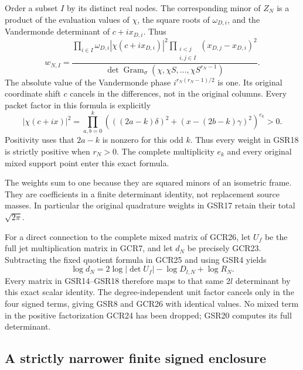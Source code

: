 Order a subset $I$ by its distinct real nodes. The corresponding
minor of $Z_N$ is a product of the evaluation values of $\chi$,
the square roots of $\omega_{D,i}$, and the Vandermonde
determinant of $c+ix_{D,i}$. Thus
\[
 w_{N,I}=
 \frac{\displaystyle
   \prod_{i\in I}\omega_{D,i}|\chi(c+ix_{D,i})|^2
   \prod_{\substack{i<j\\i,j\in I}}(x_{D,j}-x_{D,i})^2}
 {\displaystyle
   \det\operatorname{Gram}_\sigma
               (\chi,\chi S,\ldots,\chi S^{r_N-1})}.
\tag{GSR18}
\]
The absolute value of the Vandermonde phase
$i^{r_N(r_N-1)/2}$ is one. Its original coordinate shift $c$
cancels in the differences, not in the original columns.
Every packet factor in this formula is explicitly
\[
 |\chi(c+ix)|^2
  =\prod_{a,b=0}^k
     \left(((2a-k)\delta)^2+
                    (x-(2b-k)\gamma)^2\right)^{e_k}>0.
\tag{GSR19}
\]
Positivity uses that $2a-k$ is nonzero for this odd $k$.
Thus every weight in GSR18 is strictly positive when $r_N>0$.
The complete multiplicity $e_k$ and every original mixed support
point enter this exact formula.

The weights sum to one because they are squared minors of
an isometric frame. They are coefficients in a finite
determinant identity, not replacement source masses. In
particular the original quadrature weights in GSR17 retain
their total $\sqrt{2\pi}$.

For a direct connection to the complete mixed matrix of GCR26,
let $U_f$ be the full jet multiplication matrix in GCR7,
and let $d_N$ be precisely GCR23. Subtracting the fixed
quotient formula in GCR25 and using GSR4 yields
\[
 \log d_N
     =2\log|\det U_f|-\log D_{l,N}+\log R_N.
\tag{GSR20}
\]
Every matrix in GSR14--GSR18 therefore maps to that same
$2l$ determinant by this exact scalar identity. The
degree-independent unit factor cancels only in the four signed
terms, giving GSR8 and GCR26 with identical values.
No mixed term in the positive factorization GCR24 has been
dropped; GSR20 computes its full determinant.

\subsection{A strictly narrower finite signed enclosure}

